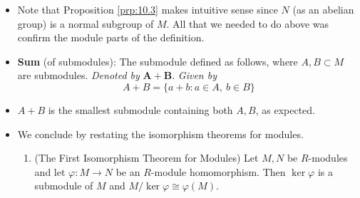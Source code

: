 \documentclass[../notes.tex]{subfiles}
\begin{document}
\begin{itemize}
\begin{proposition}
\begin{proof}
            \begin{align*}
                (ab)(x+N) &= abx+N\\
                &= a(bx+N)\\
                &= a(b(x+N))
            \end{align*}
            as desired.\par
            This concludes the proof of the first claim.\par\smallskip
            To prove that $\pi$ is a module homomorphism, it will suffice to show that it is a group homomorphism and commutes with scalar multiplication. Treating $M,M/N$ purely as groups, we may recall from group theory that $\pi$ is a group homomorphism. With respect to the other condition, we have for all $a\in R$ and $m\in M$ that
            \begin{align*}
                \pi(am) &= am+N\\
                &= a(m+N)\\
                &= a\pi(m)
            \end{align*}
            as desired.\par\smallskip
            The fact that $\ker\pi=N$ follows from group theory.
        \end{proof}
    \end{proposition}
    \item Note that Proposition \ref{prp:10.3} makes intuitive sense since $N$ (as an abelian group) is a normal subgroup of $M$. All that we needed to do above was confirm the module parts of the definition.
    \item \textbf{Sum} (of submodules): The submodule defined as follows, where $A,B\subset M$ are submodules. \emph{Denoted by} $\bm{A+B}$. \emph{Given by}
    \begin{equation*}
        A+B = \{a+b:a\in A,\ b\in B\}
    \end{equation*}
    \item $A+B$ is the smallest submodule containing both $A,B$, as expected.
    \item We conclude by restating the isomorphism theorems for modules.
    \begin{theorem}\label{trm:10.4}\leavevmode
        \begin{enumerate}[ref={\thetheorem(\arabic*)}]
            \item \label{trm:10.4a}(The First Isomorphism Theorem for Modules) Let $M,N$ be $R$-modules and let $\varphi:M\to N$ be an $R$-module homomorphism. Then $\ker\varphi$ is a submodule of $M$ and $M/\ker\varphi\cong\varphi(M)$.

\end{enumerate}
\end{theorem}
\end{itemize}
\end{document}
